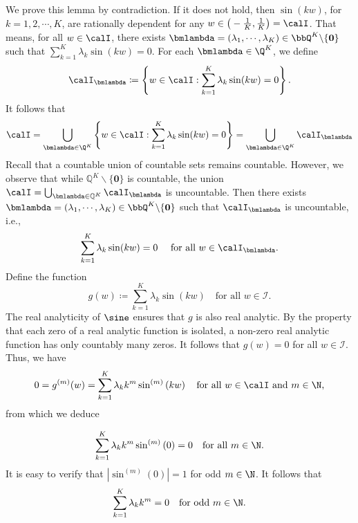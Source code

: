 \documentclass[11pt,a4paper]{article}
\begin{document}
We prove this lemma by contradiction. If it does not hold, then $\sin( k w )$, for $k=1,2,\cdots,K$, 
are rationally dependent for any $w\in \big(-\tfrac{1}{K}, \tfrac{1}{K}\big)=\calI$. That means, for all $w\in\calI$, there exists $\bmlambda=(\lambda_1,\cdots,\lambda_K)\in \bbQ^K\backslash\{\bmzero\}$ such that $\sum_{k=1}^K \lambda_k \sin(k w )=0$.
For each $\bmlambda\in \Q^K$, we define
\begin{equation*}
    \calI_\bmlambda \coloneqq 
    \left\{w \in \calI: \sum_{k=1}^K \lambda_k \sin(k w )=0\right\}.
\end{equation*}
It follows that
\begin{equation*}
    \calI=\bigcup_{\bmlambda\in\Q^K} \left\{w \in \calI: \sum_{k=1}^K \lambda_k \sin(k w )=0\right\}=\bigcup_{\bmlambda\in\Q^K} \calI_\bmlambda
\end{equation*}
Recall that a countable union of countable sets remains countable. However, we observe that while
\(\mathbb{Q}^K \backslash \{\mathbf{0}\}\)
is countable, the union
\(\calI = \bigcup_{\bmlambda \in \mathbb{Q}^K} \calI_\bmlambda\)
is uncountable.
Then there exists $\bmlambda=(\lambda_1,\cdots,\lambda_K)\in \bbQ^K\backslash\{\bmzero\}$ such that
$\calI_\bmlambda$ is uncountable, i.e.,
\begin{equation*}
    \sum_{k=1}^K \lambda_k \sin(k w )=0\quad \tn{ for all $w\in \calI_\bmlambda$.}
\end{equation*} 
Define the function 
\[
g(w) \coloneqq \sum_{k=1}^K \lambda_k \sin\left(k w\right) \quad \text{for all } w \in \mathcal{I}.
\]
The real analyticity of \(\sine\) ensures that \(g\) is also real analytic. 
By the property that each zero of a real analytic function is isolated, a non-zero real analytic function has only countably many zeros. It follows that \(g(w) = 0\) for all \(w \in \mathcal{I}\).
Thus, we have
\begin{equation*}
    0= g^{(m)}(w)=\sum_{k=1}^K \lambda_k k^m \sin^{(m)}\left(kw\right)\quad \tn{for all $w\in \calI$ and $m\in \N$,}
\end{equation*}
from which we deduce

\[
\sum_{k=1}^K \lambda_k k^m \sin^{(m)}\left(0\right)= 0 \quad \text{for all } m\in\N.
\]
It is easy to verify that 
$|\sin^{(m)}(0)|=1$ for odd $m\in\N$. It follows that
\begin{equation}\label{eq:lambdak:km:sum0:infinite:m}
    \sum_{k=1}^K \lambda_k k^m = 0\quad \tn{for odd $m\in\N$.}
\end{equation}
\end{document}

